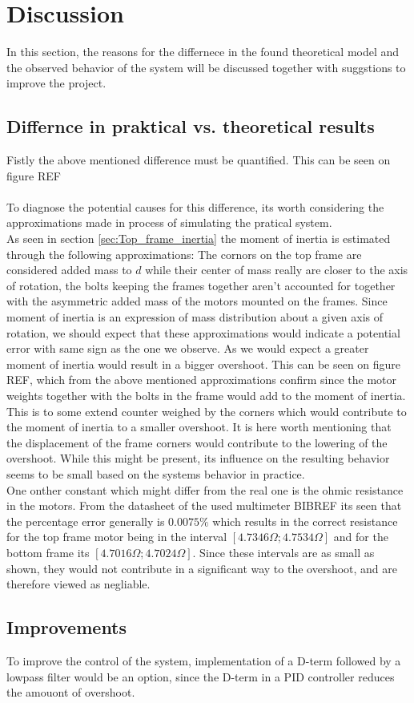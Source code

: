 \documentclass[../../main]{subfiles}
\begin{document}
\section{Discussion}
\label{sec:discussion}
In this section, the reasons for the differnece in the found theoretical model and the observed behavior of the system will be discussed together with suggstions to improve the project.
\subsection{Differnce in praktical vs. theoretical results}
Fistly the above mentioned difference must be quantified. This can be seen on figure REF\\
\\
To diagnose the potential causes for this difference, its worth considering the approximations made in process of simulating the pratical system.\\
As seen in section \ref{sec:Top_frame_inertia} the moment of inertia is estimated through the following approximations: The cornors on the top frame are considered added mass to $d$ while their center of mass really are closer to the axis of rotation, the bolts keeping the frames together aren't accounted for together with the asymmetric added mass of the motors mounted on the frames. Since moment of inertia is an expression of mass distribution about a given axis of rotation, we should expect that these approximations would indicate a potential error with same sign as the one we observe. As we would expect a greater moment of inertia would result in a bigger overshoot. This can be seen on figure REF, which from the above mentioned approximations confirm since the motor weights together with the bolts in the frame would add to the moment of inertia. This is to some extend counter weighed by the corners which would contribute to the moment of inertia to a smaller overshoot. It is here worth mentioning that the displacement of the frame corners would contribute to the lowering of the overshoot. While this might be present, its influence on the resulting behavior seems to be small based on the systems behavior in practice.\\
One onther constant which might differ from the real one is the ohmic resistance in the motors. From the datasheet of the used multimeter BIBREF its seen that the percentage error generally is $0.0075\%$ which results in the correct resistance for the top frame motor being in the interval $[4.7346\Omega;4.7534\Omega]$ and for the bottom frame its $[4.7016\Omega;4.7024\Omega]$. Since these intervals are as small as shown, they would not contribute in a significant way to the overshoot, and are therefore viewed as negliable.\\
\subsection{Improvements}
To improve the control of the system, implementation of a D-term followed by a lowpass filter would be an option, since the D-term in a PID controller reduces the amouont of overshoot. 
\end{document}
